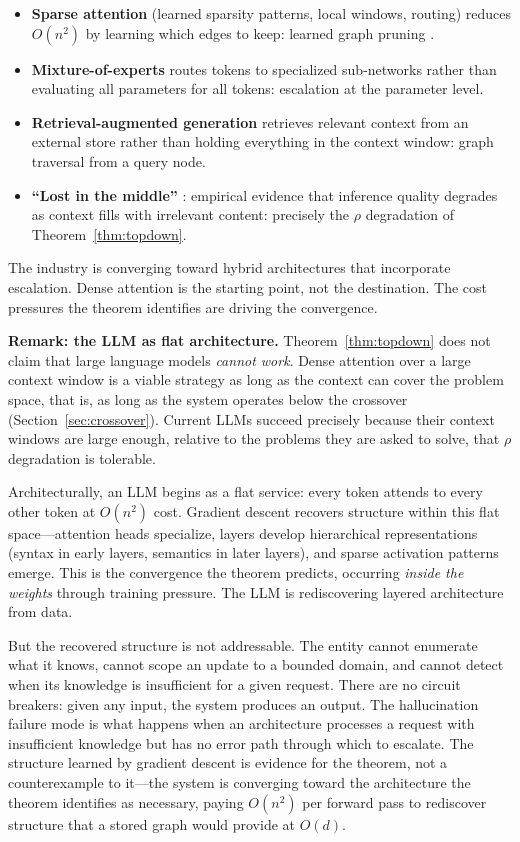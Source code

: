 \documentclass[11pt]{article}
\theoremstyle{definition}
\begin{document}
\begin{itemize}
\item \textbf{Sparse attention} (learned sparsity patterns, local
   windows, routing) reduces $O(n^2)$ by learning which edges to
   keep: learned graph pruning \cite{McCarthy2026a}.
\item \textbf{Mixture-of-experts} routes tokens to specialized
   sub-networks rather than evaluating all parameters for all tokens:
   escalation at the parameter level.
\item \textbf{Retrieval-augmented generation} retrieves relevant context
   from an external store rather than holding everything in the context
   window: graph traversal from a query node.
\item \textbf{``Lost in the middle''} \cite{Liu2024}: empirical evidence
   that inference quality degrades as context fills with irrelevant
   content: precisely the $\rho$ degradation of
   Theorem~\ref{thm:topdown}.
\end{itemize}

The industry is converging toward hybrid architectures that incorporate
escalation. Dense attention is the starting point, not the destination.
The cost pressures the theorem identifies are driving the convergence.

\textbf{Remark: the LLM as flat architecture.}
Theorem~\ref{thm:topdown} does not claim that large language models
\emph{cannot work}. Dense attention over a large context window is a
viable strategy as long as the context can cover the problem space,
that is, as long as the system operates below the crossover
(Section~\ref{sec:crossover}). Current LLMs succeed precisely because
their context windows are large enough, relative to the problems they
are asked to solve, that $\rho$ degradation is tolerable.

Architecturally, an LLM begins as a flat service: every token attends
to every other token at $O(n^2)$ cost. Gradient descent recovers
structure within this flat space---attention heads specialize, layers
develop hierarchical representations (syntax in early layers, semantics
in later layers), and sparse activation patterns emerge. This is the
convergence the theorem predicts, occurring \emph{inside the weights}
through training pressure. The LLM is rediscovering layered
architecture from data.

But the recovered structure is not addressable. The entity cannot
enumerate what it knows, cannot scope an update to a bounded domain,
and cannot detect when its knowledge is insufficient for a given
request. There are no circuit breakers: given any input, the system
produces an output. The hallucination failure mode is what happens when
an architecture processes a request with insufficient knowledge but has
no error path through which to escalate. The structure learned by
gradient descent is evidence for the theorem, not a counterexample
to it---the system is converging toward the architecture the theorem
identifies as necessary, paying $O(n^2)$ per forward pass to
rediscover structure that a stored graph would provide at $O(d)$.
\end{document}
